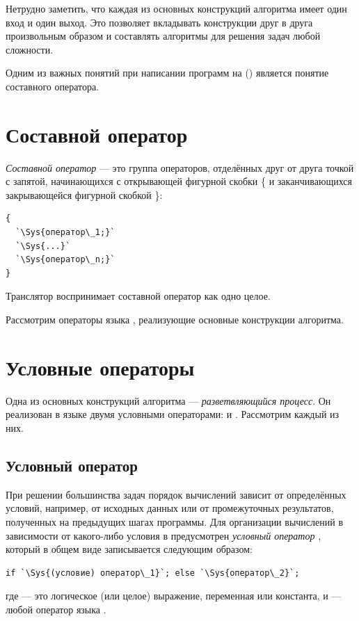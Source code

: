 Нетрудно заметить, что каждая из основных конструкций алгоритма имеет один вход и один выход. Это позволяет вкладывать
конструкции друг в друга произвольным образом и составлять алгоритмы для решения задач любой сложности.

Одним из важных понятий при написании программ на () является понятие составного оператора.

\section[Составной оператор]{Составной оператор}
\emph{Составной оператор} --- это группа операторов, отделённых друг от друга
точкой с запятой, начинающихся с открывающей фигурной скобки \{ и заканчивающихся закрывающейся
фигурной скобкой \}:
\begin{lstlisting}
{
  `\Sys{оператор\_1;}`
  `\Sys{...}`
  `\Sys{оператор\_n;}`
}
\end{lstlisting}

Транслятор воспринимает составной оператор как одно целое.

Рассмотрим операторы языка , реализующие основные конструкции алгоритма.

\section[Условные операторы]{Условные операторы}
Одна из основных конструкций алгоритма --- 
\emph{разветвляющийся процесс}. Он реализован в языке
 двумя условными операторами:  и . Рассмотрим каждый из них.

\subsection[Условный оператор]{Условный оператор}
При решении большинства задач порядок вычислений зависит от определённых условий, например, от исходных данных или от
промежуточных результатов, полученных на предыдущих шагах программы. Для организации вычислений в зависимости от
какого-либо условия в  предусмотрен \emph{условный оператор} , 
который в общем виде записывается следующим образом:
\begin{lstlisting}
if `\Sys{(условие) оператор\_1}`; else `\Sys{оператор\_2}`;
\end{lstlisting}
где  --- это логическое (или целое) выражение, переменная или константа, 
 и  --- любой оператор языка .

